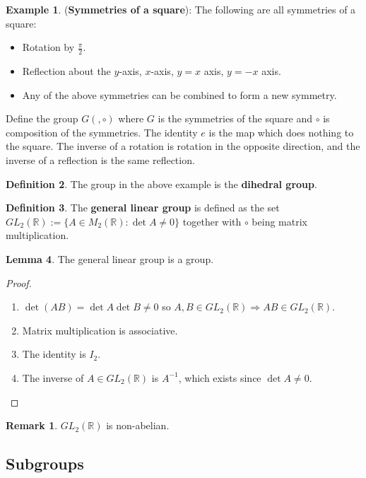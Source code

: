 \documentclass[12pt,a4paper]{article}
\theoremstyle{definition}
\newtheorem{definition}{Definition}[subsection]
\newtheorem{lemma}[definition]{Lemma}
\newtheorem{example}[definition]{Example}
\newtheorem*{remark}{Remark}
\begin{document}
\begin{example}
	(\textbf{Symmetries of a square}): The following are all symmetries of a square:
	\begin{itemize}
		\item Rotation by $\frac{\pi}{2}$.
		\item Reflection about the $y$-axis, $x$-axis, $y = x$ axis, $y = -x$ axis.
		\item Any of the above symmetries can be combined to form a new symmetry.
	\end{itemize}
	Define the group $G(, \circ)$ where $G$ is the symmetries of the square and $\circ$ is composition of the symmetries. The identity $e$ is the map which does nothing to the square. The inverse of a rotation is rotation in the opposite direction, and the inverse of a reflection is the same reflection.
\end{example}

\begin{definition}
	The group in the above example is the \textbf{dihedral group}.
\end{definition}

\begin{definition}
	The \textbf{general linear group} is defined as the set $GL_2 (\mathbb{R}) := \{ A \in M_2 (\mathbb{R}) : \det A \ne 0 \}$ together with $\circ$ being matrix multiplication.
\end{definition}

\begin{lemma}
	The general linear group is a group.
\end{lemma}

\begin{proof}
	\hfill
	\begin{enumerate}
		\item $\det (A B) = \det A \det B \ne 0$ so $A, B \in GL_2(\mathbb{R}) \Rightarrow AB \in GL_2(\mathbb{R})$.
		\item Matrix multiplication is associative.
		\item The identity is $I_2$.
		\item The inverse of $A \in GL_2(\mathbb{R})$ is $A^{-1}$, which exists since $\det A \ne 0$.
	\end{enumerate}
\end{proof}

\begin{remark}
	$GL_2(\mathbb{R})$ is non-abelian.
\end{remark}

\subsection{Subgroups}
\end{document}
